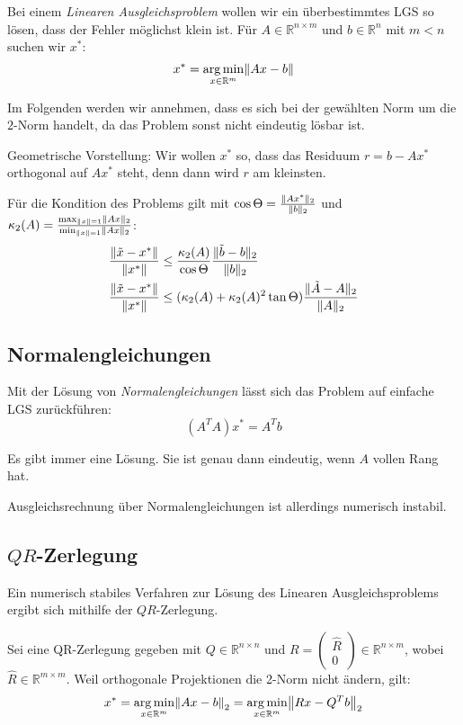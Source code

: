\documentclass[a4paper,parskip=half*,DIV=15,fontsize=11pt]{scrartcl}
\DeclarePairedDelimiter\norm{\lVert}{\rVert}
\DeclareMathOperator*\argmin{arg\,min}
\begin{document}
Bei einem \emph{Linearen Ausgleichsproblem} wollen wir ein überbestimmtes LGS so lösen, dass der Fehler möglichst klein ist. Für $A \in \mathbb{R}^{n \times m}$ und $b \in \mathbb{R}^n$ mit $m < n$ suchen wir $x^\ast$:
\[x^\ast = \argmin_{x \in \mathbb{R}^{m}} \norm*{Ax-b}\]

Im Folgenden werden wir annehmen, dass es sich bei der gewählten Norm um die $2$-Norm handelt, da das Problem sonst nicht eindeutig lösbar ist.

Geometrische Vorstellung: Wir wollen $x^\ast$ so, dass das Residuum $r = b - Ax^\ast$ orthogonal auf $Ax^\ast$ steht, denn dann wird $r$ am kleinsten.

Für die Kondition des Problems gilt mit $\cos \Theta = \frac{\norm{A x^\ast}_2}{\norm{b}_2}$ und $\kappa_2(A) = \frac{\max_{\norm{x} = 1} \norm{Ax}_2}{\min_{\norm{x} = 1} \norm{Ax}_2}$:
\begin{align*}
    \frac{\norm{\tilde x - x^\ast}}{\norm{x^\ast}} &\leq \frac{\kappa_2(A)}{\cos \Theta} \frac{\norm{\tilde b - b}_2}{\norm{b}_2} \\
    \frac{\norm{\tilde x - x^\ast}}{\norm{x^\ast}} &\leq (\kappa_2(A) + \kappa_2(A)^2 \tan \Theta) \frac{\norm{\tilde A - A}_2}{\norm{A}_2}
\end{align*}

\subsection{Normalengleichungen}

Mit der Lösung von \emph{Normalengleichungen} lässt sich das Problem auf einfache LGS zurückführen:
\[\left(A^TA\right)x^\ast = A^Tb\]

Es gibt immer eine Lösung. Sie ist genau dann eindeutig, wenn $A$ vollen Rang hat.

Ausgleichsrechnung über Normalengleichungen ist allerdings numerisch instabil.

\subsection[QR-Zerlegung]{$QR$-Zerlegung}

Ein numerisch stabiles Verfahren zur Lösung des Linearen Ausgleichsproblems ergibt sich mithilfe der $QR$-Zerlegung.

Sei eine QR-Zerlegung gegeben mit $Q \in \mathbb{R}^{n \times n}$ und $R = \begin{pmatrix} \hat{R} \\ 0 \end{pmatrix} \in \mathbb{R}^{n \times m}$, wobei $\hat{R} \in \mathbb{R}^{m \times m}$. Weil orthogonale Projektionen die 2-Norm nicht ändern, gilt:
\[
  x^\ast = \argmin_{x \in \mathbb{R}^{m}} \norm*{Ax-b}_2 = \argmin_{x \in \mathbb{R}^m} \norm*{Rx-Q^Tb}_2
\]
\end{document}
